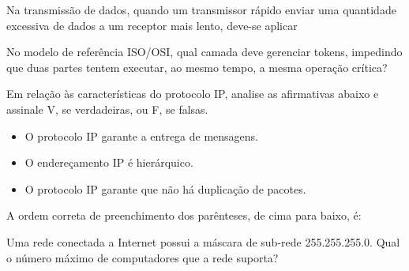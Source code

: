 \documentclass[10pt,a4paper]{article}
\begin{document}
%
{
\def\AMCbeginQuestion#1#2{\par\noindent{\bf (POSCOMP 2015 - Questão 60)}}
\begin{question}{} Na transmissão de dados, quando um transmissor rápido enviar uma quantidade excessiva de dados a um receptor mais lento, deve-se aplicar
\begin{choices}
\end{choices}
\end{question}
}
%
{
\def\AMCbeginQuestion#1#2{\par\noindent{\bf (POSCOMP 2015 - Questão 65)}}
\begin{question}{} No modelo de referência ISO/OSI, qual camada deve gerenciar tokens, impedindo que duas partes tentem executar, ao mesmo tempo, a mesma operação crítica?
\begin{choices}
\end{choices}
\end{question}
}
%
{
\def\AMCbeginQuestion#1#2{\par\noindent{\bf (POSCOMP 2016 - Questão 60)}}
\begin{question}{} Em relação às características do protocolo IP, analise as afirmativas abaixo e assinale V, se verdadeiras, ou F, se falsas.
\begin{itemize}[label={(\ )}]
\item O protocolo IP garante a entrega de mensagens.
\item O endereçamento IP é hierárquico.
\item O protocolo IP garante que não há duplicação de pacotes.
\end{itemize}
A ordem correta de preenchimento dos parênteses, de cima para baixo, é:
\begin{choices}
\end{choices}
\end{question}
}
%
{
\def\AMCbeginQuestion#1#2{\par\noindent{\bf (POSCOMP 2016 - Questão 65)}}
\begin{question}{} Uma rede conectada a Internet possui a máscara de sub-rede 255.255.255.0. Qual o número máximo de computadores que a rede suporta?
\begin{choices}
\end{choices}
\end{question}
}
\end{document}

